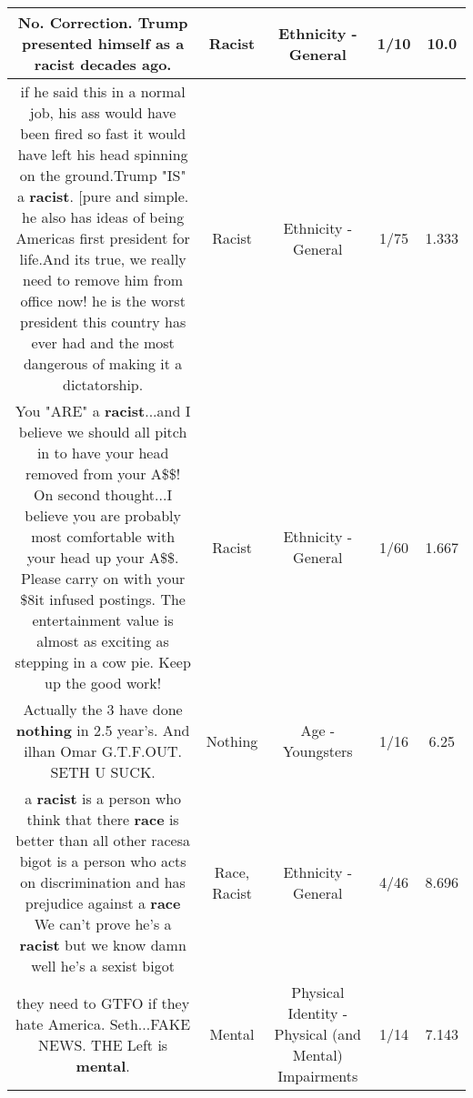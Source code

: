 \documentclass[11pt]{article}
\newlength\mylength
\begin{document}
\begin{center}
\begin{longtable}{|C{.65\mylength}|C{.30\mylength}|C{.12\mylength}|C{.12\mylength}|C{.12\mylength}|}
  \small No. Correction. Trump presented himself as a \textbf{racist} decades ago.\normalsize   & Racist & Ethnicity - General & 1/10 & 10.0 \\  \hline
  \small if he said this in a normal job, his ass would have been fired so fast it would have left his head spinning on the ground.Trump "IS" a \textbf{racist}. [pure and simple. he also has ideas of being Americas first president for life.And its true, we really need to remove him from office now! he is the worst president this country has ever had and the most dangerous of making it a dictatorship.\normalsize   & Racist & Ethnicity - General & 1/75 & 1.333 \\  \hline
  \small You "ARE" a \textbf{racist}...and I believe we should all pitch in to have your head removed from your A\$\$! On second thought...I believe you are probably most comfortable with your head up your A\$\$. Please carry on with your \$8it infused postings. The entertainment value is almost as exciting as stepping in a cow pie. Keep up the good work!\normalsize   & Racist & Ethnicity - General & 1/60 & 1.667 \\  \hline
  \small Actually the 3 have done \textbf{nothing} in 2.5 year's. And ilhan Omar G.T.F.OUT. SETH U SUCK.\normalsize   & Nothing & Age - Youngsters & 1/16 & 6.25 \\  \hline
  \small a \textbf{racist} is a person who think that there \textbf{race} is better than all other racesa bigot is a person who acts on discrimination and has prejudice against a \textbf{race} We can't prove he's a \textbf{racist} but we know damn well he's a sexist bigot\normalsize   & Race, Racist & Ethnicity - General & 4/46 & 8.696 \\  \hline
  \small they need to GTFO if they hate America. Seth...FAKE NEWS.  THE Left is \textbf{mental}.\normalsize   & Mental & Physical Identity - Physical (and Mental) Impairments & 1/14 & 7.143 \\  \hline

\end{longtable}
\end{center}
\end{document}
